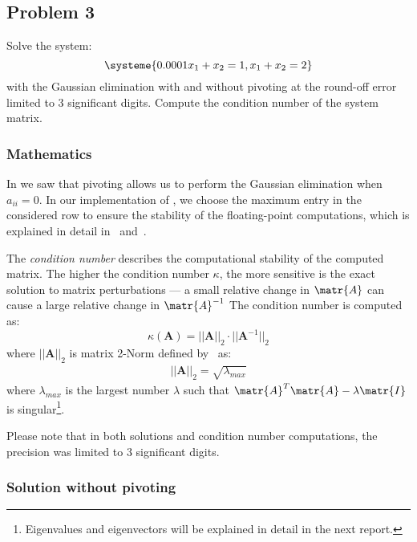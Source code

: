 \subsection{Problem 3}

Solve the system:
\begin{equation*}
    \systeme{0.0001x_1+x_2=1,x_1+x_2=2}
\end{equation*}
with the Gaussian elimination with and without pivoting at the round-off error limited to 3 significant digits. Compute the condition number of the system matrix.

\subsubsection*{Mathematics}

In  we saw that pivoting allows us to perform the Gaussian elimination when $a_{ii}=0$.
In our implementation of , we choose the maximum entry in the considered row to ensure the stability of the floating-point computations, which is explained in detail in~\cite[section 3.3]{GoluVanl96} and~\cite[section 1.5]{Meyer}.

The \textit{condition number} describes the computational stability of the computed matrix.
The higher the condition number $\kappa$, the more sensitive is the exact solution to matrix perturbations --- a small relative change in $\matr{A}$ can cause a large relative change in $\matr{A}^{-1}$
The condition number is computed as: 
\begin{equation}
    \kappa(\mathbf{A})=||\mathbf{A}||_2\cdot||\mathbf{A}^{-1}||_2
\end{equation}
where $||\mathbf{A}||_2$ is matrix 2-Norm defined by~\cite[equation 5.2.7]{Meyer} as:
\begin{equation}\label{eqn:2-norm}
\begin{split}
    ||\mathbf{A}||_2 = \sqrt{\lambda_{max}}
\end{split}
\end{equation}
where $\lambda_{max}$ is the largest number $\lambda$ such that $\matr{A}^T\matr{A}-\lambda\matr{I}$ is singular\footnote{Eigenvalues and eigenvectors will be explained in detail in the next report.}. 

Please note that in both solutions and condition number computations, the precision was limited to 3 significant digits.

\subsubsection*{Solution without pivoting}

